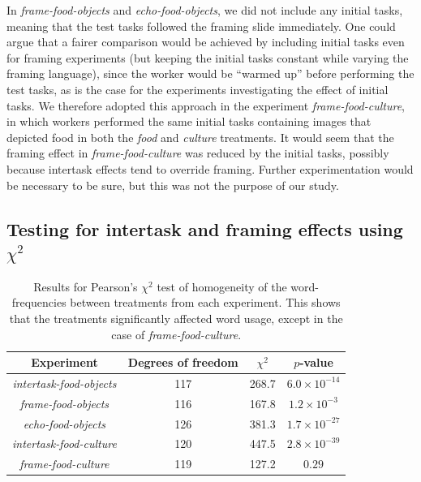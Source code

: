 \documentclass[12pt]{article}
\begin{document}
In \textit{frame-food-objects} and \textit{echo-food-objects}, we did not
include any initial tasks, meaning that the test tasks followed the framing
slide immediately.  One could argue that a fairer comparison would be achieved
by including initial tasks even for framing experiments (but keeping the
initial tasks constant while varying the framing language), since the worker
would be ``warmed up'' before performing the test tasks, as is the case for
the experiments investigating the effect of initial tasks. 
We therefore adopted this approach in the experiment 
\textit{frame-food-culture}, in which workers performed the same 
initial tasks containing images that depicted food in both the \textit{food}
and \textit{culture} treatments.  It would seem that the framing effect in 
\textit{frame-food-culture} was reduced by the initial tasks, possibly because
intertask effects tend to override framing. Further experimentation 
would be necessary to be sure, but this was not the purpose of our study.

\subsection*{Testing for intertask and framing effects using $\chi^2$}

\begin{table}
\centering
\begin{tabular}{c c c c}
\toprule
Experiment & Degrees of freedom & $\chi^2$ & $p$-value\\
\toprule
\textit{intertask-food-objects} & 117 & 268.7 & $6.0 \times 10^{-14}$\\
\textit{frame-food-objects} & 116 & 167.8 & $1.2 \times 10^{-3}$\\
\textit{echo-food-objects} & 126 & 381.3 & $1.7 \times 10^{-27}$\\
\textit{intertask-food-culture} & 120 & 447.5 & $2.8 \times 10^{-39}$\\
\textit{frame-food-culture} & 119 & 127.2 & $0.29$\\
\bottomrule
\end{tabular}
\caption{
	Results for Pearson's $\chi^2$ test of homogeneity of the word-frequencies
	between treatments from each experiment.  This shows that the treatments
	significantly affected word usage, 
	except in the case of \textit{frame-food-culture}.
}
\label{table:chi2}
\end{table}
\end{document}
